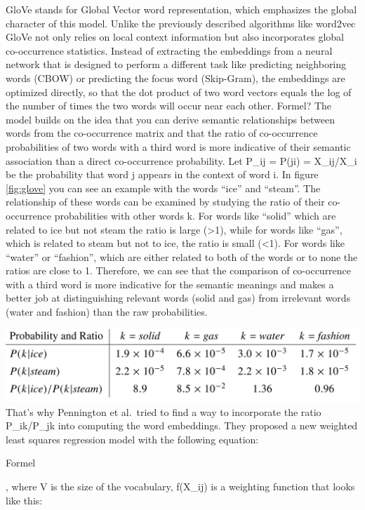 \documentclass[]{krantz}
\begin{document}
GloVe stands for Global Vector word representation, which emphasizes the global character of this model. Unlike the previously described algorithms like word2vec GloVe not only relies on local context information but also incorporates global co-occurrence statistics. Instead of extracting the embeddings from a neural network that is designed to perform a different task like predicting neighboring words (CBOW) or predicting the focus word (Skip-Gram), the embeddings are optimized directly, so that the dot product of two word vectors equals the log of the number of times the two words will occur near each other. Formel? The model builds on the idea that you can derive semantic relationships between words from the co-occurrence matrix and that the ratio of co-occurrence probabilities of two words with a third word is more indicative of their semantic association than a direct co-occurrence probability.
Let P\_ij = P(j\textbar{}i) = X\_ij/X\_i be the probability that word j appears in the context of word i. In figure \ref{fig:glove} you can see an example with the words ``ice'' and ``steam''. The relationship of these words can be examined by studying the ratio of their co-occurrence probabilities with other words k.
For words like ``solid'' which are related to ice but not steam the ratio is large (\textgreater{}1), while for words like ``gas'', which is related to steam but not to ice, the ratio is small (\textless{}1). For words like ``water'' or ``fashion'', which are either related to both of the words or to none the ratios are close to 1. Therefore, we can see that the comparison of co-occurrence with a third word is more indicative for the semantic meanings and makes a better job at distinguishing relevant words (solid and gas) from irrelevant words (water and fashion) than the raw probabilities.

\includegraphics{figures/01-01-foundations-applications-of-modern-NLP/01-01_glove_ratios.png}
That's why Pennington et al.~tried to find a way to incorporate the ratio P\_ik/P\_jk into computing the word embeddings. They proposed a new weighted least squares regression model with the following equation:

Formel

, where V is the size of the vocabulary, f(X\_ij) is a weighting function that looks like this:
\end{document}
